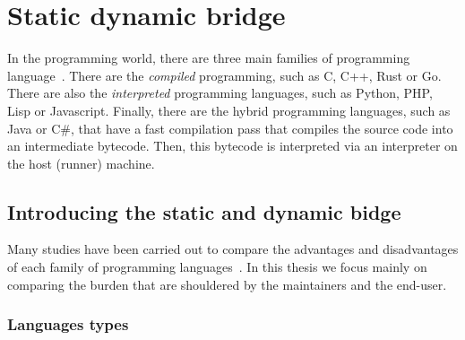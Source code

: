 \chapter{Static dynamic bridge}
\label{chap:static_dynamic_bridge}


In the programming world, there are three main families of programming language~\parencite{kwame.2017.qualitative}.
There are the \emph{compiled} programming, such as C, C++, Rust or Go. There are also the \emph{interpreted} programming
languages, such as Python, PHP, Lisp or Javascript. Finally, there are the hybrid programming languages, such as Java or
C\#, that have a fast compilation pass that compiles the source code into an intermediate bytecode. Then, this bytecode
is interpreted via an interpreter on the host (runner) machine.


\section{Introducing the static and dynamic bidge}

Many studies have been carried out to compare the advantages and disadvantages of each family of programming
languages~\parencite{prechelt.2000.comparison,kwame.2017.qualitative,boehm.1984.economics}. In this thesis we focus
mainly on comparing the burden that are shouldered by the maintainers and the end-user.


\subsection{Languages types}

